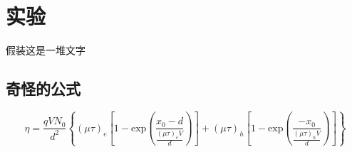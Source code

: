 \chapter{实验}
假装这是一堆文字
\section{奇怪的公式}
\begin{equation}
	\eta = \frac{qVN_0}{d^2}\left\{(\mu\tau)_e \left[1-\text{exp}\left(\frac{x_0-d}{\frac{(\mu\tau)_e V}{d}}\right)\right]+(\mu\tau)_h \left[1-\text{exp}\left(\frac{-x_0}{\frac{(\mu\tau)_h V}{d}}\right)\right]\right\}
\end{equation}
